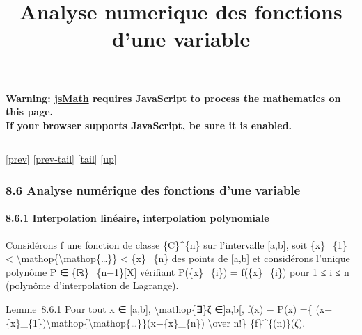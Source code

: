 \documentclass[]{article}
\title{Analyse numerique des fonctions d'une variable}
\author{}
\date{}
\begin{document}
\maketitle

\textbf{Warning: \href{http://www.math.union.edu/locate/jsMath}{jsMath}
requires JavaScript to process the mathematics on this page.\\ If your
browser supports JavaScript, be sure it is enabled.}

\begin{center}\rule{3in}{0.4pt}\end{center}

{[}\href{coursse48.html}{prev}{]}
{[}\href{coursse48.html\#tailcoursse48.html}{prev-tail}{]}
{[}\hyperref[tailcoursse49.html]{tail}{]}
{[}\href{coursch9.html\#coursse49.html}{up}{]}

\subsubsection{8.6 Analyse numérique des fonctions d'une variable}

\paragraph{8.6.1 Interpolation linéaire, interpolation polynomiale}

Considérons f une fonction de classe \{C\}\^{}\{n\} sur l'intervalle
{[}a,b{]}, soit \{x\}\_\{1\} \textless{}
\textbackslash{}mathop\{\textbackslash{}mathop\{\ldots{}\}\} \textless{}
\{x\}\_\{n\} des points de {[}a,b{]} et considérons l'unique polynôme P
∈ \{ℝ\}\_\{n−1\}{[}X{]} vérifiant P(\{x\}\_\{i\}) = f(\{x\}\_\{i\}) pour
1 ≤ i ≤ n (polynôme d'interpolation de Lagrange).

Lemme~8.6.1 Pour tout x ∈ {[}a,b{]}, \textbackslash{}mathop\{∃\}ζ
∈{]}a,b{[}, f(x) − P(x) =\{
(x−\{x\}\_\{1\})\textbackslash{}mathop\{\textbackslash{}mathop\{\ldots{}\}\}(x−\{x\}\_\{n\})
\textbackslash{}over n!\} \{f\}\^{}\{(n)\}(ζ).
\end{document}

